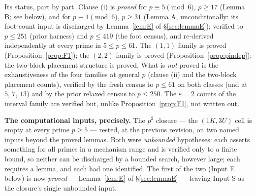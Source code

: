 Its status, part by part. Clause (i) is \emph{proved} for $p\equiv5\pmod6$,
$p\ge17$ (Lemma B; see below), and for $p\equiv1\pmod6$, $p\ge31$
(Lemma A, unconditionally: its foot-count input is discharged by
Lemma~\ref{lem:E} of \S\ref{sec:lemmaE}); verified to $p\le251$ (prior
harness) and $p\le419$ (the foot census), and re-derived independently
at every prime in $5\le p\le 61$. The $(1,1)$ family is proved (Proposition~\ref{prop:F1}); the $(2,2)$
family is proved (Proposition~\ref{prop:pindep}); the two-block placement
structure is proved. What is \emph{not} proved is the exhaustiveness of the
four families at general $p$ (clause (ii) and the two-block placement
counts), verified by the fresh census to $p\le61$ on both classes (and at
$5$, $7$, $13$) and by the prior relaxed census to $p\le250$. The
$\varepsilon=2$ counts of the interval family are verified but, unlike
Proposition~\ref{prop:F1}, not written out.

\medskip
\noindent\textbf{The computational inputs, precisely.} The $p^2$
closure --- the $(1K,3U)$ cell is empty at every prime $p\ge5$ --- rested,
at the previous revision, on two named inputs beyond the proved lemmas.
Both were \emph{unbounded} hypotheses: each asserts something for all
primes in a mechanism range and is verified only to a finite bound, so
neither can be discharged by a bounded search, however large; each
requires a lemma, and each had one identified. The first of the two
(Input E below) is now \emph{proved} --- Lemma~\ref{lem:E} of
\S\ref{sec:lemmaE} --- leaving Input S as the closure's single
unbounded input.

